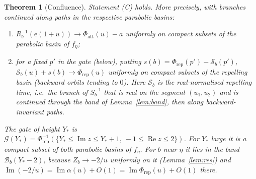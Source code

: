 \documentclass[11pt,a4paper]{article}
\newtheorem{theorem}{Theorem}
\theoremstyle{definition}
\newcommand{\Rr}{R}
\newcommand{\eee}{\mathrm{e}}
\begin{document}
\begin{theorem}[Confluence]\label{thm:C}
Statement \textup{(C)} holds.  More precisely, with branches continued along
paths in the respective parabolic basins:
\begin{enumerate}
\item $\Rr_b^{-1}(\eee(1+u))\to\Phi_{\mathrm{att}}(u)-a$ uniformly on compact
  subsets of the parabolic basin of $f_\eta$;
\item for a fixed $p'$ in the gate (below), putting
  $s(b)=\Phi_{\mathrm{rep}}(p')-\mathcal S_b(p')$,
  $\mathcal S_b(u)+s(b)\to\Phi_{\mathrm{rep}}(u)$ uniformly on compact
  subsets of the repelling basin (backward orbits tending to $0$).  Here
  $\mathcal S_b$ is the real-normalised repelling time, i.e.\ the branch of
  $S_b^{-1}$ that is real on the segment $(u_1,u_2)$ and is continued through
  the band of Lemma~\ref{lem:band}, then along backward-invariant paths.
\end{enumerate}
The \emph{gate} of height $Y_*$ is $\mathcal G(Y_*)=\Phi_{\mathrm{rep}}^{-1}
(\{Y_*\le\operatorname{Im}z\le Y_*+1,\ -1\le\operatorname{Re}z\le2\})$.  For $Y_*$ large it is a compact
subset of both parabolic basins of $f_\eta$.  For $b$ near $\eta$ it lies in
the band $\mathcal B_b(Y_*-2)$, because $Z_b\to-2/u$ uniformly on it
(Lemma~\ref{lem:res}) and $\operatorname{Im}(-2/u)=\operatorname{Im}\alpha(u)+O(1)
=\operatorname{Im}\Phi_{\mathrm{rep}}(u)+O(1)$ there.
\end{theorem}
\end{document}
